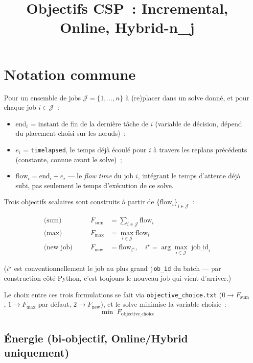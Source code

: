 \documentclass[11pt]{article}
\title{Objectifs CSP~: Incremental, Online, Hybrid-n\_j}
\author{}
\date{}
\begin{document}
\maketitle

\section{Notation commune}

Pour un ensemble de jobs $\mathcal{J} = \{1, \dots, n\}$ à (re)placer dans un solve donné, et pour
chaque job $i \in \mathcal{J}$~:

\begin{itemize}
  \item $\mathrm{end}_i$ = instant de fin de la dernière tâche de $i$ (variable de décision,
        dépend du placement choisi sur les nœuds)~;
  \item $e_i$ = \texttt{timelapsed}, le temps déjà écoulé pour $i$ à travers les replans
        précédents (constante, connue avant le solve)~;
  \item $\mathrm{flow}_i = \mathrm{end}_i + e_i$ — le \emph{flow time} du job $i$, intégrant le
        temps d'attente déjà subi, pas seulement le temps d'exécution de ce solve.
\end{itemize}

Trois objectifs scalaires sont construits à partir de $\{\mathrm{flow}_i\}_{i \in \mathcal{J}}$~:

\begin{align}
  \text{(sum)} \quad && F_{\mathrm{sum}} &= \sum_{i \in \mathcal{J}} \mathrm{flow}_i \\
  \text{(max)} \quad && F_{\mathrm{max}} &= \max_{i \in \mathcal{J}} \mathrm{flow}_i \\
  \text{(new job)} \quad && F_{\mathrm{new}} &= \mathrm{flow}_{i^\star}, \quad
      i^\star = \arg\max_{i \in \mathcal{J}} \; \mathrm{job\_id}_i
\end{align}

($i^\star$ est conventionnellement le job au plus grand \texttt{job\_id} du batch — par construction
côté Python, c'est toujours le nouveau job qui vient d'arriver.)

Le choix entre ces trois formulations se fait via \texttt{objective\_choice.txt}
($0 \to F_{\mathrm{sum}}$, $1 \to F_{\mathrm{max}}$ par défaut, $2 \to F_{\mathrm{new}}$), et le
solve minimise la variable choisie~:
\[
  \min \; F_{\mathrm{objective\_choice}}
\]

\subsection{Énergie (bi-objectif, Online/Hybrid uniquement)}
\end{document}
